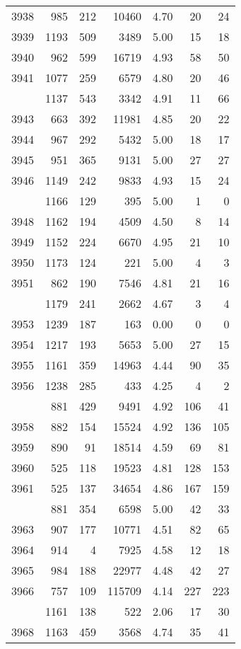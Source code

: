 \documentclass[
]{article}
\begin{document}
\begin{table}
\begin{tabular}[t]{lrrrrrr}
3938 & 985 & 212 & 10460 & 4.70 & 20 & 24\\
3939 & 1193 & 509 & 3489 & 5.00 & 15 & 18\\
3940 & 962 & 599 & 16719 & 4.93 & 58 & 50\\
3941 & 1077 & 259 & 6579 & 4.80 & 20 & 46\\
\addlinespace
3942 & 1137 & 543 & 3342 & 4.91 & 11 & 66\\
3943 & 663 & 392 & 11981 & 4.85 & 20 & 22\\
3944 & 967 & 292 & 5432 & 5.00 & 18 & 17\\
3945 & 951 & 365 & 9131 & 5.00 & 27 & 27\\
3946 & 1149 & 242 & 9833 & 4.93 & 15 & 24\\
\addlinespace
3947 & 1166 & 129 & 395 & 5.00 & 1 & 0\\
3948 & 1162 & 194 & 4509 & 4.50 & 8 & 14\\
3949 & 1152 & 224 & 6670 & 4.95 & 21 & 10\\
3950 & 1173 & 124 & 221 & 5.00 & 4 & 3\\
3951 & 862 & 190 & 7546 & 4.81 & 21 & 16\\
\addlinespace
3952 & 1179 & 241 & 2662 & 4.67 & 3 & 4\\
3953 & 1239 & 187 & 163 & 0.00 & 0 & 0\\
3954 & 1217 & 193 & 5653 & 5.00 & 27 & 15\\
3955 & 1161 & 359 & 14963 & 4.44 & 90 & 35\\
3956 & 1238 & 285 & 433 & 4.25 & 4 & 2\\
\addlinespace
3957 & 881 & 429 & 9491 & 4.92 & 106 & 41\\
3958 & 882 & 154 & 15524 & 4.92 & 136 & 105\\
3959 & 890 & 91 & 18514 & 4.59 & 69 & 81\\
3960 & 525 & 118 & 19523 & 4.81 & 128 & 153\\
3961 & 525 & 137 & 34654 & 4.86 & 167 & 159\\
\addlinespace
3962 & 881 & 354 & 6598 & 5.00 & 42 & 33\\
3963 & 907 & 177 & 10771 & 4.51 & 82 & 65\\
3964 & 914 & 4 & 7925 & 4.58 & 12 & 18\\
3965 & 984 & 188 & 22977 & 4.48 & 42 & 27\\
3966 & 757 & 109 & 115709 & 4.14 & 227 & 223\\
\addlinespace
3967 & 1161 & 138 & 522 & 2.06 & 17 & 30\\
3968 & 1163 & 459 & 3568 & 4.74 & 35 & 41\\

\end{tabular}
\end{table}
\end{document}
